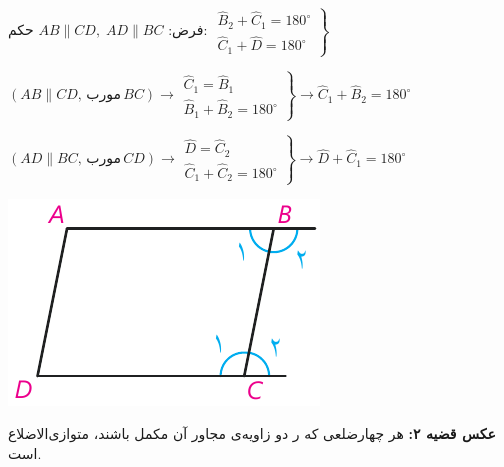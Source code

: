 \documentclass[12pt, a4paper]{book}
\begin{document}
\begin{minipage}{.7\textwidth}
	\centering فرض: 
	$AB \parallel CD, \; AD \parallel BC$
	\qquad حکم:
	$ \left. \begin{array}{rrr}
		\widehat{B}_2 + \widehat{C}_1 = 180^{\circ} \\ \widehat{C}_1 + \widehat{D} = 180^{\circ}
	\end{array} \right\}$
	\begin{flushleft}
		$(AB \parallel CD, \, \text{مورب} \, BC ) \rightarrow \left. \begin{array}{rll}
			  \widehat{C}_1 = \widehat{B}_1 \\ \widehat{B}_1 + \widehat{B}_2 = 180^{\circ} 
		\end{array} \right\} \rightarrow \widehat{C}_1 + \widehat{B}_2 = 180^{\circ} $
	
		$(AD \parallel BC, \, \text{مورب} \, CD ) \rightarrow \left. \begin{array}{rll}
			\widehat{D} = \widehat{C}_2 \\ \widehat{C}_1 + \widehat{C}_2 = 180^{\circ}
		\end{array} \right\} \rightarrow \widehat{D} + \widehat{C}_1 = 180^{\circ}$
	\end{flushleft}
\end{minipage}
\begin{minipage}{.28\textwidth}
	\begin{flushleft}
		\includegraphics{"Shapes/Fasl - 3/Dars 1/qazie 2.pdf"}
	\end{flushleft}
\end{minipage}
\newline \bigskip \bigskip

\textbf{عکس قضیه ۲:} هر چهارضلعی که ر دو زاویه‌ی مجاور آن مکمل‌ باشند، متوازی‌الاضلاع است.
\end{document}
